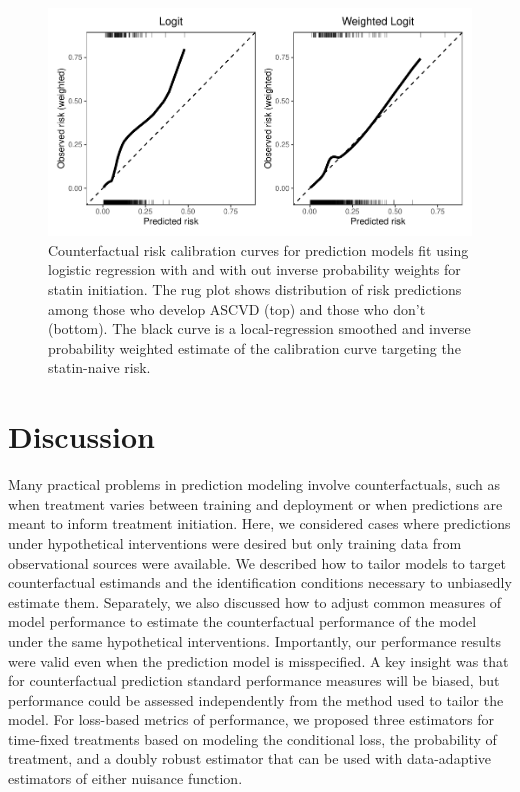 \begin{figure}[p]
    \centering
    \includegraphics{../3_figures/calib.pdf}
    \caption{Counterfactual risk calibration curves for prediction models fit using logistic regression with and with out inverse probability weights for statin initiation. The rug plot shows distribution of risk predictions among those who develop ASCVD (top) and those who don't (bottom). The black curve is a local-regression smoothed and inverse probability weighted estimate of the calibration curve targeting the statin-naive risk.\label{fig:calib}}
\end{figure}

\section{Discussion} \label{sec:discussion}
Many practical problems in prediction modeling involve counterfactuals, such as when treatment varies between training and deployment or when predictions are meant to inform treatment initiation. Here, we considered cases where predictions under hypothetical interventions were desired but only training data from observational sources were available. We described how to tailor models to target counterfactual estimands and the identification conditions necessary to unbiasedly estimate them. Separately, we also discussed how to adjust common measures of model performance to estimate the counterfactual performance of the model under the same hypothetical interventions. Importantly, our performance results were valid even when the prediction model is misspecified. A key insight was that for counterfactual prediction standard performance measures will be biased, but performance could be assessed independently from the method used to tailor the model. For loss-based metrics of performance, we proposed three estimators for time-fixed treatments based on modeling the conditional loss, the probability of treatment, and a doubly robust estimator that can be used with data-adaptive estimators of either nuisance function. 

